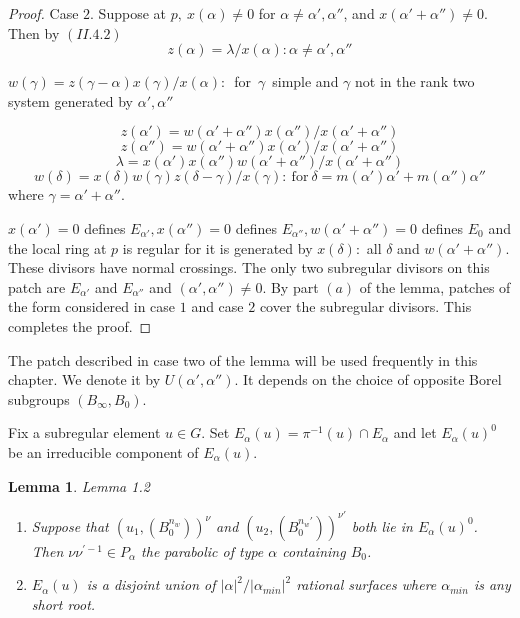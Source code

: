 \documentclass{memo-l}
\newtheorem{lemma}[theorem]{Lemma}
\theoremstyle{definition}
\theoremstyle{remark}
\numberwithin{section}{chapter}
\numberwithin{equation}{chapter}
\begin{document}
\begin{proof}
   Case $2$.  Suppose at $p,\  x({\alpha}) \ne 0$ for ${\alpha} \ne
{\alpha}',{\alpha''}$, and $x({\alpha}'+{\alpha''}) \ne 0$.  Then by $(II.4.2)$
$$
z({\alpha})  =  {\lambda}/x({\alpha}) : {\alpha} \ne {\alpha}',{\alpha''}
$$

$w({\gamma})  =  z({\gamma}-{\alpha})x({\gamma})/x({\alpha}):$\ for\ ${\gamma}$\
simple and ${\gamma}$ not in the rank two system generated by
${\alpha}', {\alpha}''$

$$
z({\alpha}')  =  w({\alpha}'+{\alpha''})x({\alpha''})/x({\alpha}'+{\alpha''})
$$
$$
z({\alpha''})  =  w({\alpha}'+{\alpha''})x({\alpha}')/x({\alpha}'+{\alpha}'')
$$
$$
{\lambda}  =
x({\alpha}')x({\alpha}'')w({\alpha}'+{\alpha}'')/x({\alpha}'+{\alpha}'')
$$
$$
w({\delta})  =  x({\delta})w({\gamma})z({\delta}-{\gamma})/x({\gamma}):\
{\text{for}}\ {\delta}  =  m({\alpha}'){\alpha}'+m({\alpha''}){\alpha''}
$$
where ${\gamma}  =  {\alpha}'+{\alpha''}$.



$x({\alpha}')  =  0$ defines $E_{{\alpha}'}, x({\alpha''})  =  0$ defines
$E_{{\alpha}''}, w({\alpha}'+{\alpha''})  =  0$ defines $E_{0}$ and the local ring
at $p$ is regular for it is generated by $x({\delta}) :$ all ${\delta}$ and
$w({\alpha}'+{\alpha''})$.  These divisors have normal crossings.  The only
two subregular divisors on this patch are $E_{{\alpha}'}$ and
$E_{{\alpha}''}$ and $({\alpha}',{\alpha''}) \ne 0$.  By part $(a)$ of the
lemma, patches of the form considered in case $1$ and case $2$ cover the
subregular divisors.  This completes the proof.
\end{proof}
{\medskip}

   The patch described in case two of the lemma will be used frequently in
this chapter.  We denote it by $U({\alpha}',{\alpha''})$.  It depends on the
choice of opposite Borel subgroups $(B_{{\infty}},B_{0})$.

   Fix a subregular element $u \in G$.  Set $E_{{\alpha}}(u)  =
{\pi}^{-1}(u) \cap E_{{\alpha}}$ and let $E_{{\alpha}}(u)^{0}$ be an
irreducible component of $E_{{\alpha}}(u)$.

\begin{lemma}{Lemma 1.2}
\begin{enumerate}[label=\alph*)]
\item Suppose that $(u_{1},(B_{0}^{n_w}))^\nu$ and
$(u_{2},(B_{0}^{n_w'}))^{\nu'}$ both lie in
$E_{{\alpha}}(u)^{0}$.  Then ${\nu}{\nu}^{\prime-1} \in P_{{\alpha}}$ the
parabolic of type ${\alpha}$ containing $B_{0}$.
\item $E_{{\alpha}}(u)$ is a disjoint union of $\vert {\alpha}\vert ^{2}/\vert
{\alpha}_{min}\vert ^{2}$ rational surfaces where ${\alpha}_{min}$ is any
short root.
\end{enumerate}
\end{lemma}
\end{document}
